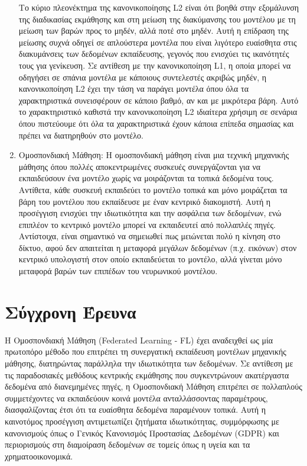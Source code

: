 \begin{enumerate}
    Το κύριο πλεονέκτημα της κανονικοποίησης L2 είναι ότι βοηθά στην εξομάλυνση της διαδικασίας εκμάθησης και στη μείωση της διακύμανσης του μοντέλου με τη μείωση των βαρών προς το μηδέν, αλλά ποτέ στο μηδέν. Αυτή η επίδραση της μείωσης συχνά οδηγεί σε απλούστερα μοντέλα που είναι λιγότερο ευαίσθητα στις διακυμάνσεις των δεδομένων εκπαίδευσης, γεγονός που ενισχύει τις ικανότητές τους για γενίκευση. Σε αντίθεση με την κανονικοποίηση L1, η οποία μπορεί να οδηγήσει σε σπάνια μοντέλα με κάποιους συντελεστές ακριβώς μηδέν, η κανονικοποίηση L2 έχει την τάση να παράγει μοντέλα όπου όλα τα χαρακτηριστικά συνεισφέρουν σε κάποιο βαθμό, αν και με μικρότερα βάρη. Αυτό το χαρακτηριστικό καθιστά την κανονικοποίηση L2 ιδιαίτερα χρήσιμη σε σενάρια όπου πιστεύουμε ότι όλα τα χαρακτηριστικά έχουν κάποια επίπεδα σημασίας και πρέπει να διατηρηθούν στο μοντέλο.

    \item Ομοσπονδιακή Μάθηση: Η ομοσπονδιακή μάθηση είναι μια τεχνική μηχανικής μάθησης όπου πολλές αποκεντρωμένες συσκευές συνεργάζονται για να εκπαιδεύσουν ένα μοντέλο χωρίς να μοιράζονται τα τοπικά δεδομένα τους. Αντίθετα, κάθε συσκευή εκπαιδεύει το μοντέλο τοπικά και μόνο μοιράζεται τα βάρη του μοντέλου που εκπαίδευσε με έναν κεντρικό διακομιστή. Αυτή η προσέγγιση ενισχύει την ιδιωτικότητα και την ασφάλεια των δεδομένων, ενώ επιπλέον το κεντρικό μοντέλο μπορεί να εκπαιδευτεί από πολλαπλές πηγές. Αντίστοιχα, είναι σημαντικό να σημειωθεί πως μειώνεται πολύ η κίνηση στο δίκτυο, αφού δεν απαιτείται η μεταφορά μεγάλων δεδομένων (π.χ. εικόνων) στον κεντρικό υπολογιστή στον οποίο εκπαιδεύεται το μοντέλο, αλλά γίνεται μόνο μεταφορά βαρών των επιπέδων του νευρωνικού μοντέλου.

\end{enumerate}

\section{Σύγχρονη Έρευνα}

Η Ομοσπονδιακή Μάθηση (Federated Learning - FL) έχει αναδειχθεί ως μία πρωτοπόρο μέθοδο που επιτρέπει τη συνεργατική εκπαίδευση μοντέλων μηχανικής μάθησης, διατηρώντας παράλληλα την ιδιωτικότητα των δεδομένων. Σε αντίθεση με τις παραδοσιακές μεθόδους κεντρικής εκμάθησης που συγκεντρώνουν ακατέργαστα δεδομένα από διανεμημένες πηγές, η Ομοσπονδιακή Μάθηση επιτρέπει σε πολλαπλούς συμμετέχοντες να εκπαιδεύουν κοινά μοντέλα ανταλλάσσοντας παραμέτρους, διασφαλίζοντας έτσι ότι τα ευαίσθητα δεδομένα παραμένουν τοπικά. Αυτή η καινοτόμος προσέγγιση αντιμετωπίζει ζητήματα ιδιωτικότητας, συμμόρφωσης με κανονισμούς όπως ο Γενικός Κανονισμός Προστασίας Δεδομένων (GDPR) και περιορισμούς στη διαμοίραση δεδομένων σε τομείς όπως η υγεία και τα χρηματοοικονομικά.

